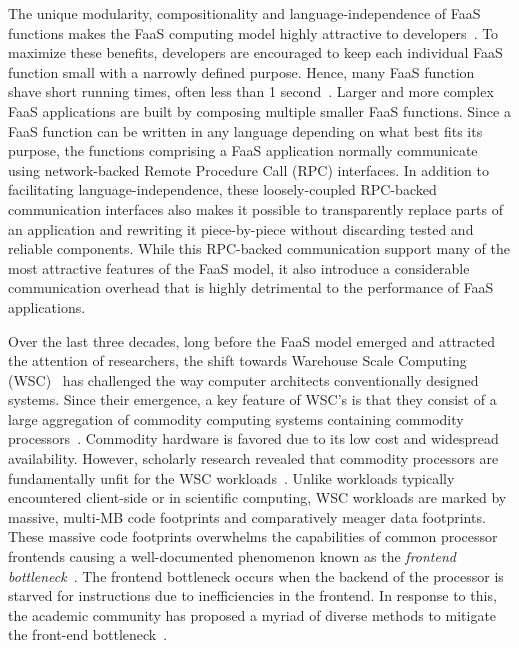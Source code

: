 \documentclass[../main.tex]{subfiles}
\begin{document}
\begin{refsection}
The unique modularity, compositionality and language-independence of
FaaS functions makes the FaaS computing model highly attractive to
developers~\cite{williams16_growin_need_micros_bioin}. To maximize
these benefits, developers are encouraged to keep each individual FaaS
function small with a narrowly defined purpose. Hence, many FaaS
function shave short running times, often less than 1
second~\cite{shahrad19_archit_implic_funct_servic_comput,mahgoub22_wisef,shahrad20_server_wild,lukewarm_serverless,du20_catal}.
Larger and more complex FaaS applications are built by composing
multiple smaller FaaS functions. Since a FaaS function can be written
in any language depending on what best fits its purpose, the functions
comprising a FaaS application normally communicate using
network-backed Remote Procedure Call (RPC) interfaces. In addition to
facilitating language-independence, these loosely-coupled RPC-backed
communication interfaces also makes it possible to transparently
replace parts of an application and rewriting it piece-by-piece
without discarding tested and reliable components. While this
RPC-backed communication support many of the most attractive features
of the FaaS model, it also introduce a considerable communication
overhead that is highly detrimental to the performance of FaaS
applications.

Over the last three decades, long before the FaaS model emerged and
attracted the attention of researchers, the shift towards Warehouse
Scale Computing (WSC)~\cite{barroso18_datac_as_comput} has challenged
the way computer architects conventionally designed systems. Since
their emergence, a key feature of WSC's is that they consist of a
large aggregation of commodity computing systems containing commodity
processors~\cite{barroso03_web_searc_planet}. Commodity hardware is
favored due to its low cost and widespread availability. However,
scholarly research revealed that commodity processors are
fundamentally unfit for the WSC
workloads~\cite{ferdman12_clear_cloud,kanev15_profil}. Unlike
workloads typically encountered client-side or in scientific
computing, WSC workloads are marked by massive, multi-MB code
footprints and comparatively meager data footprints. These massive
code footprints overwhelms the capabilities of common processor
frontends causing a well-documented phenomenon known as the
\emph{frontend
  bottleneck}~\cite{ailamaki99_dbmss_moder_proces,keeton98_perfor_charac_quad_pentium_pro,ranganathan98_perfor_datab_workl_shared_memor}. The
frontend bottleneck occurs when the backend of the processor is
starved for instructions due to inefficiencies in the frontend. In
response to this, the academic community has proposed a myriad of
diverse methods to mitigate the front-end
bottleneck~\cite{reinman99_fetch_direc_instr_prefet,kumar17_boomer,kumar18_blast_throug_front_end_bottl_with_shotg,kumar20_shoot_down_server_front_end_bottl,ferdman08_tempor,ferdman11_proac_instr_fetch,kaynak13_shift,kaynak15_confl,ayers19_asmdb,ajorpaz18_explor_predic_replac_polic_instr,khan20_i_spy,soundararajan21_pdede,ansari20_divid,khan21_rippl,}.



\end{refsection}
\end{document}
